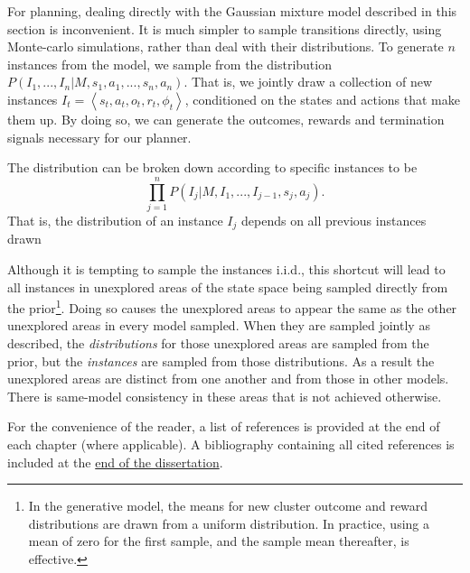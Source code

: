 For planning, dealing directly with the Gaussian mixture model described in this section is inconvenient. It is much simpler to sample transitions directly, using Monte-carlo simulations, rather than deal with their distributions. To generate $n$ instances from the model, we sample from the distribution $P(I_1,...,I_n|M,s_1,a_1,...,s_n,a_n)$. That is, we jointly draw a collection of new instances $I_t=\left<s_t,a_t,o_t,r_t,\phi_t\right>$, conditioned on the states and actions that make them up. By doing so, we can generate the outcomes, rewards and termination signals necessary for our planner.

The distribution can be broken down according to specific instances to be $$\prod_{j=1}^n P(I_j|M,I_1,...,I_{j-1},s_j,a_j).$$ That is, the distribution of an instance $I_j$ depends on all previous instances drawn

Although it is tempting to sample the instances i.i.d., this shortcut will lead to all instances in unexplored areas of the state space being sampled directly from the prior\footnote{In the generative model, the means for new cluster outcome and reward distributions are drawn from a uniform distribution. In practice, using a mean of zero for the first sample, and the sample mean thereafter, is effective.}. Doing so causes the unexplored areas to appear the same as the other unexplored areas in every model sampled. When they are sampled jointly as described, the \emph{distributions} for those unexplored areas are sampled from the prior, but the \emph{instances} are sampled from those distributions. As a result the unexplored areas are distinct from one another and from those in other models. There is same-model consistency in these areas that is not achieved otherwise.


%
\ifperchapterbib%
For the convenience of the reader, a list of references is provided at the end of each chapter (where applicable).
\ifendbib%
A bibliography containing all cited references is included at the \hyperref[sec:bibliography]{end of the dissertation}.
\else\fi%
\cbend%
\else\fi%